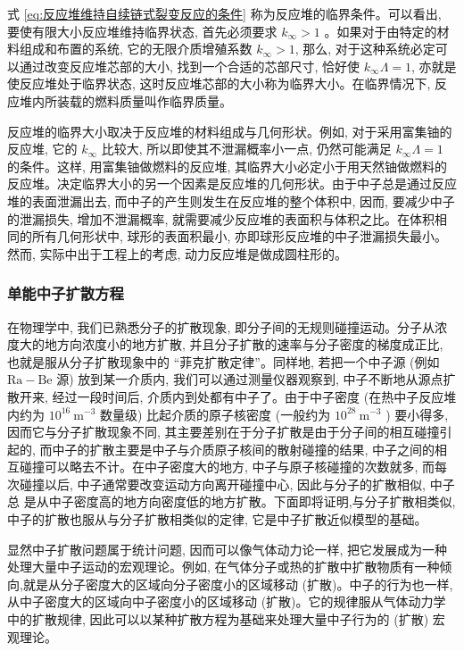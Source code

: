 \documentclass{Sichuan Normal University}
\begin{document}
式 \eqref{eq:反应堆维持自续链式裂变反应的条件} 称为反应堆的临界条件。可以看出, 要使有限大小反应堆维持临界状态, 首先必须要求 $k_{\infty}>1$ 。如果对于由特定的材料组成和布置的系统, 它的无限介质增殖系数 $k_{\infty}>1$, 那么, 对于这种系统必定可以通过改变反应堆芯部的大小, 找到一个合适的芯部尺寸, 恰好使 $k_{\infty} \Lambda=1$, 亦就是使反应堆处于临界状态, 这时反应堆芯部的大小称为临界大小。在临界情况下, 反应堆内所装载的燃料质量叫作临界质量。

反应堆的临界大小取决于反应堆的材料组成与几何形状。例如, 对于采用富集铀的反应堆, 它的 $k_{\infty}$ 比较大, 所以即使其不泄漏概率小一点, 仍然可能满足 $k_{\infty} \Lambda=1$ 的条件。这样, 用富集铀做燃料的反应堆, 其临界大小必定小于用天然铀做燃料的反应堆。决定临界大小的另一个因素是反应堆的几何形状。由于中子总是通过反应堆的表面泄漏出去, 而中子的产生则发生在反应堆的整个体积中, 因而, 要减少中子的泄漏损失, 增加不泄漏概率, 就需要减少反应堆的表面积与体积之比。在体积相同的所有几何形状中, 球形的表面积最小, 亦即球形反应堆的中子泄漏损失最小。然而, 实际中出于工程上的考虑, 动力反应堆是做成圆柱形的。

\subsubsection{单能中子扩散方程}
在物理学中, 我们已熟悉分子的扩散现象, 即分子间的无规则碰撞运动。分子从浓度大的地方向浓度小的地方扩散, 并且分子扩散的速率与分子密度的梯度成正比, 也就是服从分子扩散现象中的 “菲克扩散定律”。同样地, 若把一个中子源 (例如 $\mathrm{Ra}-\mathrm{Be}$ 源) 放到某一介质内, 我们可以通过测量仪器观察到, 中子不断地从源点扩散开来, 经过一段时间后, 介质内到处都有中子了。由于中子密度 (在热中子反应堆内约为 $10^{16} \mathrm{~m}^{-3}$ 数量级) 比起介质的原子核密度 (一般约为 $10^{28} \mathrm{~m}^{-3}$ ) 要小得多, 因而它与分子扩散现象不同, 其主要差别在于分子扩散是由于分子间的相互碰撞引起的, 而中子的扩散主要是中子与介质原子核间的散射碰撞的结果, 中子之间的相互碰撞可以略去不计。在中子密度大的地方, 中子与原子核碰撞的次数就多, 而每次碰撞以后, 中子通常要改变运动方向离开碰撞中心, 因此与分子的扩散相似, 中子总
是从中子密度高的地方向密度低的地方扩散。下面即将证明,与分子扩散相类似, 中子的扩散也服从与分子扩散相类似的定律, 它是中子扩散近似模型的基础。

显然中子扩散问题属于统计问题, 因而可以像气体动力论一样, 把它发展成为一种处理大量中子运动的宏观理论。例如, 在气体分子或热的扩散中扩散物质有一种倾向,就是从分子密度大的区域向分子密度小的区域移动 (扩散)。中子的行为也一样, 从中子密度大的区域向中子密度小的区域移动 (扩散)。它的规律服从气体动力学中的扩散规律, 因此可以以某种扩散方程为基础来处理大量中子行为的 (扩散) 宏观理论。
\end{document}
